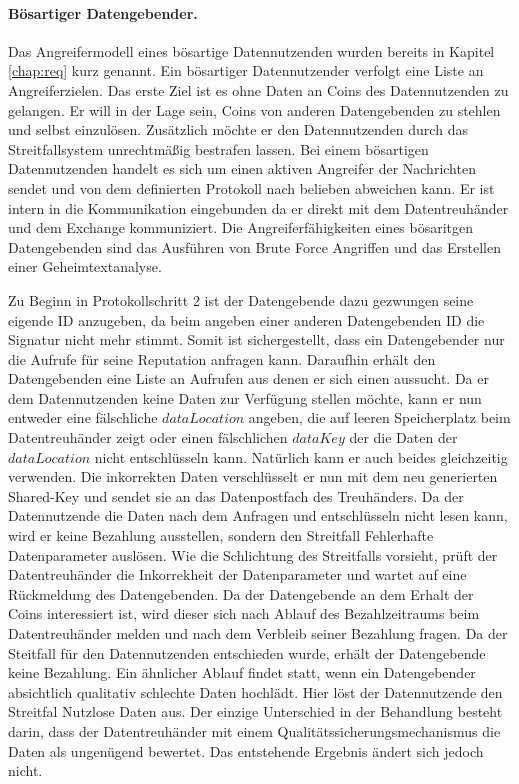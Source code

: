 \documentclass[
	fontsize=12pt,
	headings=small,
	parskip=half,           %
	bibliography=totoc,
	numbers=noenddot,       %
	open=any,               %
]{scrreprt}
\begin{document}
\paragraph{Bösartiger Datengebender.}
Das Angreifermodell eines bösartige Datennutzenden wurden bereits in Kapitel \ref{chap:req} kurz genannt. Ein bösartiger Datennutzender verfolgt eine Liste an Angreiferzielen. Das erste Ziel ist es ohne Daten an Coins des Datennutzenden zu gelangen. Er will in der Lage sein, Coins von anderen Datengebenden zu stehlen und selbst einzulösen. Zusätzlich möchte er den Datennutzenden durch das Streitfallsystem unrechtmäßig bestrafen lassen. Bei einem bösartigen Datennutzenden handelt es sich um einen aktiven Angreifer der Nachrichten sendet und von dem definierten Protokoll nach belieben abweichen kann. Er ist intern in die Kommunikation eingebunden da er direkt mit dem Datentreuhänder und dem Exchange kommuniziert. Die Angreiferfähigkeiten eines bösaritgen Datengebenden sind das Ausführen von Brute Force Angriffen und das Erstellen einer Geheimtextanalyse.

Zu Beginn in Protokollschritt 2 ist der Datengebende dazu gezwungen seine eigende ID anzugeben, da beim angeben einer anderen Datengebenden ID die Signatur nicht mehr stimmt. Somit ist sichergestellt, dass ein Datengebender nur die Aufrufe für seine Reputation anfragen kann. Daraufhin erhält den Datengebenden eine Liste an Aufrufen aus denen er sich einen aussucht. Da er dem Datennutzenden keine Daten zur Verfügung stellen möchte, kann er nun entweder eine fälschliche $dataLocation$ angeben, die auf leeren Speicherplatz beim Datentreuhänder zeigt oder einen fälschlichen $dataKey$ der die Daten der $dataLocation$ nicht entschlüsseln kann. Natürlich kann er auch beides gleichzeitig verwenden. Die inkorrekten Daten verschlüsselt er nun mit dem neu generierten Shared-Key und sendet sie an das Datenpostfach des Treuhänders. Da der Datennutzende die Daten nach dem Anfragen und entschlüsseln nicht lesen kann, wird er keine Bezahlung ausstellen, sondern den Streitfall Fehlerhafte Datenparameter auslösen. Wie die Schlichtung des Streitfalls vorsieht, prüft der Datentreuhänder die Inkorrekheit der Datenparameter und wartet auf eine Rückmeldung des Datengebenden. Da der Datengebende an dem Erhalt der Coins interessiert ist, wird dieser sich nach Ablauf des Bezahlzeitraums beim Datentreuhänder melden und nach dem Verbleib seiner Bezahlung fragen. Da der Steitfall für den Datennutzenden entschieden wurde, erhält der Datengebende keine Bezahlung. Ein ähnlicher Ablauf findet statt, wenn ein Datengebender absichtlich qualitativ schlechte Daten hochlädt. Hier löst der Datennutzende den Streitfal Nutzlose Daten aus. Der einzige Unterschied in der Behandlung besteht darin, dass der Datentreuhänder mit einem Qualitätssicherungsmechanismus die Daten als ungenügend bewertet. Das entstehende Ergebnis ändert sich jedoch nicht.
\end{document}
